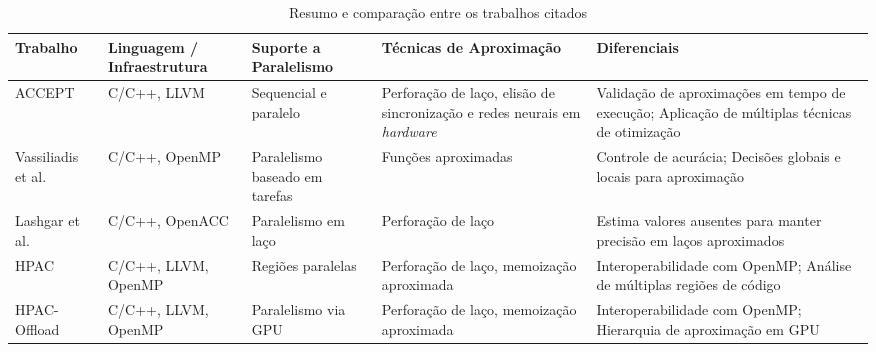 \begin{table}[htb]
    \centering
    \caption{Resumo e comparação entre os trabalhos citados}
    \begin{tabular}{|p{2.3cm}|p{3cm}|p{2cm}|p{3cm}|p{4cm}|}
        \hline
        \textbf{Trabalho}                         & \textbf{Linguagem / Infraestrutura} & \textbf{Suporte a Paralelismo} & \textbf{Técnicas de Aproximação}                                                                        & \textbf{Diferenciais}                                                                                                                                                      \\
        \hline
        ACCEPT~\cite{sampson2015}                 & C/C++, LLVM                         & Sequencial e paralelo          & Perforação de laço, elisão de sincronização e redes neurais em \textit{hardware}                        & Validação de aproximações em tempo de execução; Aplicação de múltiplas técnicas de otimização                                                                              \\
        \hline
        Vassiliadis et al.~\cite{vassiliadis2015} & C/C++, OpenMP                       & Paralelismo baseado em tarefas & Funções aproximadas                                                                                     & Controle de acurácia; Decisões globais e locais para aproximação                                                                                                           \\
        \hline
        Lashgar et al.~\cite{lashgar2018}         & C/C++, OpenACC                      & Paralelismo em laço            & Perforação de laço                                                                                      & Estima valores ausentes para manter precisão em laços aproximados                                                                                                          \\
        \hline
        HPAC~\cite{parasyris2021}                 & C/C++, LLVM, OpenMP                 & Regiões paralelas              & Perforação de laço, memoização aproximada                                                               & Interoperabilidade com OpenMP; Análise de múltiplas regiões de código                                                                                                      \\
        \hline
        HPAC-Offload~\cite{fink2023}              & C/C++, LLVM, OpenMP                 & Paralelismo via GPU            & Perforação de laço, memoização aproximada                                                               & Interoperabilidade com OpenMP; Hierarquia de aproximação em GPU                                                                                                            \\

\end{tabular}
\end{table}
